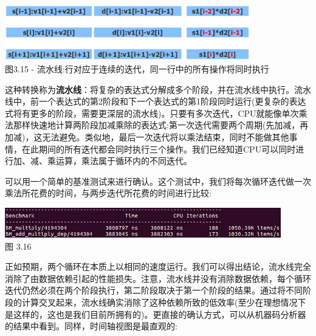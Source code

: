 \begin{center}
\includegraphics[width=0.8\textwidth]{content/1/chapter3/images/15.jpg}\\
图3.15 - 流水线:行对应于连续的迭代，同一行中的所有操作将同时执行
\end{center}

这种转换称为\textbf{流水线}：将复杂的表达式分解成多个阶段，并在流水线中执行。流水线中，前一个表达式的第2阶段和下一个表达式的第1阶段同时运行(更复杂的表达式将有更多的阶段，需要更深层的流水线)。只要有多次迭代，CPU就能像单次乘法那样快速地计算两阶段加减乘除的表达式:第一次迭代需要两个周期(先加减，再加减)，这无法避免。类似地，最后一次迭代将以乘法结束，同时不能做其他事情，在此期间的所有迭代都会同时执行三个操作。我们已经知道CPU可以同时进行加、减、乘运算，乘法属于循环内的不同迭代。

可以用一个简单的基准测试来进行确认。这个测试中，我们将每次循环迭代做一次乘法所花费的时间，与两步迭代所花费的时间进行比较:

\begin{center}
\includegraphics[width=0.9\textwidth]{content/1/chapter3/images/16.jpg}\\
图 3.16
\end{center}

正如预期，两个循环在本质上以相同的速度运行。我们可以得出结论，流水线完全消除了由数据依赖引起的性能损失。注意，流水线并没有消除数据依赖，每个循环迭代仍然必须在两个阶段执行，第二阶段取决于第一个阶段的结果。通过将不同阶段的计算交叉起来，流水线确实消除了这种依赖所致的低效率(至少在理想情况下是这样的，这也是我们目前所拥有的)。更直接的确认方式，可以从机器码分析器的结果中看到。同样，时间轴视图是最直观的:

